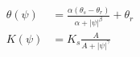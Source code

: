 \begin{equation}
\begin{aligned}
    \theta(\psi) &= \frac{\alpha (\theta_s - \theta_r)}{\alpha + |\psi|^\beta} + \theta_r \\
    K(\psi) &= K_s \frac{A}{A+|\psi|^\gamma}
\end{aligned}
\end{equation}
